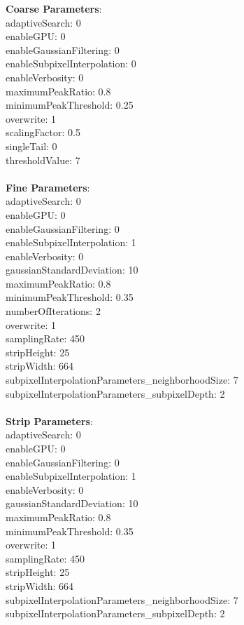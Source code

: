 \documentclass[11pt]{article}
\begin{document}
\textbf{Coarse Parameters}: \\
adaptiveSearch: 0\\
enableGPU: 0\\
enableGaussianFiltering: 0\\
enableSubpixelInterpolation: 0\\
enableVerbosity: 0\\
maximumPeakRatio: 0.8\\
minimumPeakThreshold: 0.25\\
overwrite: 1\\
scalingFactor: 0.5\\
singleTail: 0\\
thresholdValue: 7\\
\\
\textbf{Fine Parameters}: \\
adaptiveSearch: 0\\
enableGPU: 0\\
enableGaussianFiltering: 0\\
enableSubpixelInterpolation: 1\\
enableVerbosity: 0\\
gaussianStandardDeviation: 10\\
maximumPeakRatio: 0.8\\
minimumPeakThreshold: 0.35\\
numberOfIterations: 2\\
overwrite: 1\\
samplingRate: 450\\
stripHeight: 25\\
stripWidth: 664\\
subpixelInterpolationParameters\_neighborhoodSize: 7\\
subpixelInterpolationParameters\_subpixelDepth: 2\\
\\
\textbf{Strip Parameters}: \\
adaptiveSearch: 0\\
enableGPU: 0\\
enableGaussianFiltering: 0\\
enableSubpixelInterpolation: 1\\
enableVerbosity: 0\\
gaussianStandardDeviation: 10\\
maximumPeakRatio: 0.8\\
minimumPeakThreshold: 0.35\\
overwrite: 1\\
samplingRate: 450\\
stripHeight: 25\\
stripWidth: 664\\
subpixelInterpolationParameters\_neighborhoodSize: 7\\
subpixelInterpolationParameters\_subpixelDepth: 2\\
\\
\newpage
\end{document}
